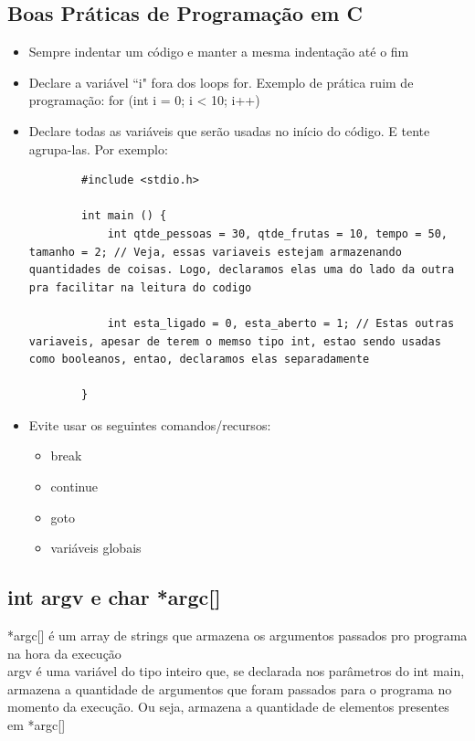 \documentclass{article}
\begin{document}
\subsection{Boas Práticas de Programação em C}
\begin{itemize}
    \item Sempre indentar um código e manter a mesma indentação até o fim

    \item Declare a variável ``i" fora dos loops for. Exemplo de prática ruim de programação: for (int i = 0; i < 10; i++) {}

    \item Declare todas as variáveis que serão usadas no início do código. E tente agrupa-las. Por exemplo:
    \begin{lstlisting}
        #include <stdio.h>

        int main () {
            int qtde_pessoas = 30, qtde_frutas = 10, tempo = 50, tamanho = 2; // Veja, essas variaveis estejam armazenando quantidades de coisas. Logo, declaramos elas uma do lado da outra pra facilitar na leitura do codigo

            int esta_ligado = 0, esta_aberto = 1; // Estas outras variaveis, apesar de terem o memso tipo int, estao sendo usadas como booleanos, entao, declaramos elas separadamente
            
        }
    \end{lstlisting}

    \item Evite usar os seguintes comandos/recursos:
    \begin{itemize}
        \item break

        \item continue

        \item goto

        \item variáveis globais
    \end{itemize}
\end{itemize}

\subsection{int argv e char *argc[]}
*argc[] é um array de strings que armazena os argumentos passados pro programa na hora da execução
\\[2pt]
argv é uma variável do tipo inteiro que, se declarada nos parâmetros do int main, armazena a quantidade de argumentos que foram passados para o programa no momento da execução. Ou seja, armazena a quantidade de elementos presentes em *argc[]
\end{document}
